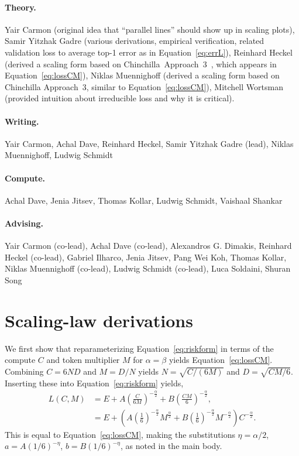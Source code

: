 \begin{appendix}
\paragraph{Theory.}
Yair Carmon (original idea that ``parallel lines'' should show up in scaling plots),
Samir Yitzhak Gadre (various derivations, empirical verification, related validation loss to average top-1 error as in Equation~\eqref{eq:errL}),
Reinhard Heckel (derived a scaling form based on Chinchilla~Approach~3~\cite{chinchilla}, which appears in Equation~\eqref{eq:lossCM}),
Niklas Muennighoff (derived a scaling form based on Chinchilla Approach~3, similar to Equation~\eqref{eq:lossCM}),
Mitchell Wortsman (provided intuition about irreducible loss and why it is critical).

\paragraph{Writing.}
Yair Carmon,
Achal Dave,
Reinhard Heckel,
Samir Yitzhak Gadre (lead), 
Niklas Muennighoff,
Ludwig Schmidt

\paragraph{Compute.}
Achal Dave, Jenia Jitsev, Thomas Kollar, Ludwig Schmidt, Vaishaal Shankar

\paragraph{Advising.}
Yair Carmon (co-lead),
Achal Dave (co-lead),
Alexandros G. Dimakis,
Reinhard Heckel (co-lead),
Gabriel Ilharco,
Jenia Jitsev, 
Pang Wei Koh,
Thomas Kollar,
Niklas Muennighoff (co-lead),
Ludwig Schmidt (co-lead),
Luca Soldaini,
Shuran Song

\clearpage


\section{Scaling-law derivations}
\label{appx:theory}

We first show that reparameterizing Equation~\eqref{eq:riskform} in terms of the compute $C$ and token multiplier $M$ for $\alpha=\beta$ yields Equation~\eqref{eq:lossCM}. 
Combining $C=6ND$ and $M=D/N$ yields $N=\sqrt{C/(6M)}$ and $D = \sqrt{CM/6}$. Inserting these into Equation~\eqref{eq:riskform} yields,
\begin{align*}
L(C,M) &= E + A \left( \frac{C}{6M}\right)^{-\frac{\alpha}{2}} + B \left( \frac{CM}{6}\right)^{-\frac{\alpha}{2}},\\
&= E + \left( A \left( \frac{1}{6}\right)^{-\frac{\alpha}{2}} M^{\frac{\alpha}{2}} +  B \left(\frac{1}{6}\right)^{-\frac{\alpha}{2}} M^{-\frac{\alpha}{2}} \right) C^{-\frac{\alpha}{2}}.
\end{align*}
This is equal to Equation~\eqref{eq:lossCM}, making the substitutions $\eta = \alpha/2$, $a = A(1/6)^{-\eta}$, $b=B(1/6)^{-\eta}$, as noted in the main body.  


\end{appendix}
